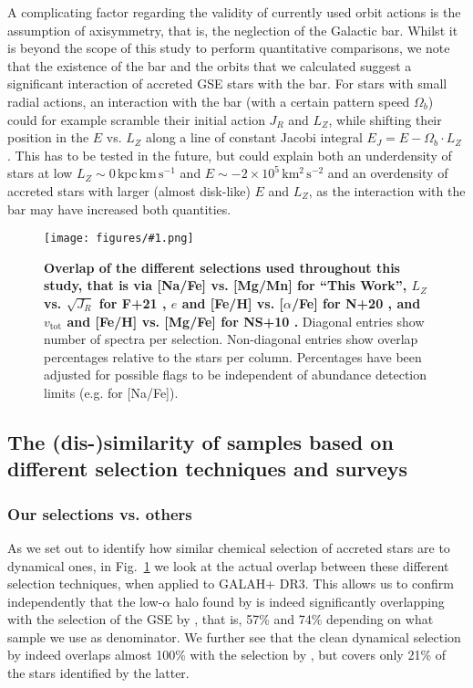 \documentclass[fleqn,usenatbib]{mnras}
\newcommand{\kpckms}{\,\mathrm{kpc\,km\,s^{-1}}}	%
\newcommand{\kmkmss}{\,\mathrm{km^2\,s^{-2}}}	%
\newcommand{\codeicon}{{\faCloudDownload}}
\newcommand{\codelink}[1]{\href{https://github.com/svenbuder/buder_galah_accreted_chemistry/tree/main/figures/#1.ipynb}{\codeicon}\,\,}
\newcommand{\oscaption}[2]{\caption{#2 \codelink{#1}}}
\newcommand{\figurecolumnwidth}[3]{\begin{figure} \centering \texttt{[image: figures/\#1.png]}\oscaption{#2}{#3}\label{fig:#1} \end{figure}}
\begin{document}
A complicating factor regarding the validity of currently used orbit actions is the assumption of axisymmetry, that is, the neglection of the Galactic bar. Whilst it is beyond the scope of this study to perform quantitative comparisons, we note that the existence of the bar and the orbits that we calculated suggest a significant interaction of accreted GSE stars with the bar. For stars with small radial actions, an interaction with the bar (with a certain pattern speed $\Omega_b$) could for example scramble their initial action $J_R$ and $L_Z$, while shifting their position in the $E$ vs. $L_Z$ along a line of constant Jacobi integral $E_J = E - \Omega_b \cdot L_Z$ \citep{Binney2008}. This has to be tested in the future, but could explain both an underdensity of stars at low $L_Z \sim 0 \kpckms$ and $E \sim -2\times10^5 \kmkmss $ and an overdensity of accreted stars with larger (almost disk-like) $E$ and $L_Z$, as the interaction with the bar may have increased both quantities.

\figurecolumnwidth{selection_overlap}{chronochemodynamic_comparison}{
\textbf{Overlap of the different selections used throughout this study, that is via [Na/Fe] vs. [Mg/Mn] for ``This Work'', $L_Z$ vs. $\sqrt{J_R}$ for F+21 \citep{Feuillet2021}, $e$ and [Fe/H] vs. [$\alpha$/Fe] for N+20 \citep{Naidu2020}, and $v_\text{tot}$ and [Fe/H] vs. [Mg/Fe] for NS+10 \citep{Nissen2010}.} Diagonal entries show number of spectra per selection. Non-diagonal entries show overlap percentages relative to the stars per column. Percentages have been adjusted for possible flags to be independent of abundance detection limits (e.g. for [Na/Fe]). 
}

\subsection{The (dis-)similarity of samples based on different selection techniques and surveys} \label{sec:dissimilarity}

\subsubsection{Our selections vs. others}

As we set out to identify how similar chemical selection of accreted stars are to dynamical ones, in Fig.~\ref{fig:selection_overlap} we look at the actual overlap between these different selection techniques, when applied to GALAH+ DR3. This allows us to confirm independently that the low-$\alpha$ halo found by \citet{Nissen2010} is indeed significantly overlapping with the selection of the GSE by \citet{Naidu2020}, that is, 57\% and 74\% depending on what sample we use as denominator. We further see that the clean dynamical selection by \citet{Feuillet2021} indeed overlaps almost 100\% with the selection by \citet{Naidu2020}, but covers only 21\% of the stars identified by the latter.
\end{document}
